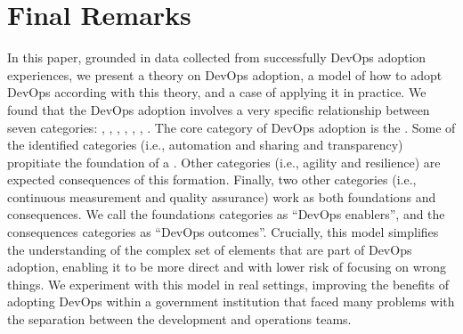 \section{Final Remarks} \label{sec:conclusion}

In this paper, grounded in data collected from successfully DevOps adoption
experiences, we present a theory on DevOps adoption, a model of how to adopt
DevOps according with this theory, and a case of applying it in practice.
We found that the DevOps adoption involves a very specific relationship between
seven categories: , , \cc, , , , .
The core category of DevOps adoption is the \cc. Some of the
identified categories (i.e., automation and sharing and transparency) propitiate
the foundation of a \cc. Other categories
(i.e., agility and resilience) are expected consequences of this formation.
Finally, two other categories (i.e., continuous measurement and quality
assurance) work as both foundations and consequences. We call the foundations
categories as ``DevOps enablers'', and the consequences categories as ``DevOps outcomes''.
Crucially, this model simplifies the understanding of the
complex set of elements that are part of DevOps adoption, enabling it to be
more direct and with lower risk of focusing on wrong things. We experiment with 
this model in real settings, improving the benefits of adopting DevOps 
within a government institution that faced many problems with the separation between the 
development and operations teams. 



